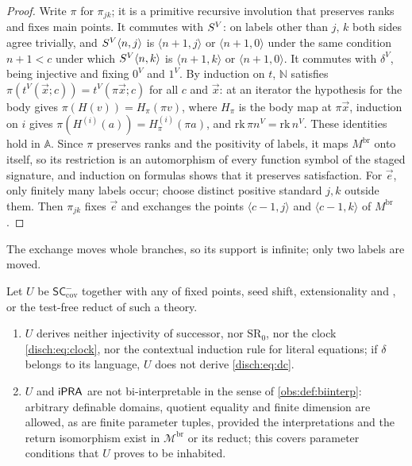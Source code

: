 \begin{proof}
Write $\pi$ for $\pi_{jk}$; it is a primitive recursive involution that
preserves ranks and fixes main points. It commutes with $S^V$: on labels
other than $j$, $k$ both sides agree trivially, and
$S^V\langle n,j\rangle$ is $\langle n+1,j\rangle$ or $\langle n+1,0\rangle$
under the same condition $n+1<c$ under which $S^V\langle n,k\rangle$ is
$\langle n+1,k\rangle$ or $\langle n+1,0\rangle$. It commutes with
$\delta^V$, being injective and fixing $0^V$ and $1^V$. By induction on $t$,
$\mathbb N$ satisfies $\pi(t^V(\vec x;c))=t^V(\pi\vec x;c)$ for all $c$ and
$\vec x$: at an iterator the hypothesis for the body gives
$\pi(H(v))=H_\pi(\pi v)$, where $H_\pi$ is the body map at $\pi\vec x$,
induction on $i$ gives $\pi(H^{(i)}(a))=H_\pi^{(i)}(\pi a)$, and
$\mathrm{rk}\,\pi n^V=\mathrm{rk}\,n^V$. These identities hold in
$\mathbb A$. Since $\pi$ preserves ranks and the positivity of labels, it
maps $M^{\mathrm{br}}$ onto itself, so its restriction is an automorphism of
every function symbol of the staged signature, and induction on formulas
shows that it preserves satisfaction. For $\vec e$, only finitely many
labels occur; choose distinct positive standard $j,k$ outside them. Then
$\pi_{jk}$ fixes $\vec e$ and exchanges the points $\langle c-1,j\rangle$
and $\langle c-1,k\rangle$ of $M^{\mathrm{br}}$.
\end{proof}

The exchange moves whole branches, so its support is infinite; only two
labels are moved.

\begin{theorem}
\label{disch:thm:sc-cov}
Let $U$ be $\mathsf{SC}^{-}_{\mathrm{cov}}$ together with any of fixed points,
seed shift, extensionality and , or the test-free reduct of
such a theory.
\begin{enumerate}[label=\textup{(\roman*)}]
\item $U$ derives neither injectivity of successor, nor $\mathrm{SR}_0$,
 nor the clock \eqref{disch:eq:clock}, nor the contextual induction rule for
 literal equations; if $\delta$ belongs to its language, $U$ does not derive
 \eqref{disch:eq:dc}.
\item $U$ and $\mathsf{iPRA}$ are not bi-interpretable in the sense of
 \cref{obs:def:biinterp}: arbitrary definable domains, quotient equality and
 finite dimension are allowed, as are finite parameter tuples, provided the
 interpretations and the return isomorphism exist in $\mathcal M^{\mathrm{br}}$
 or its reduct; this covers parameter conditions that $U$ proves to be
 inhabited.
\end{enumerate}
\end{theorem}

